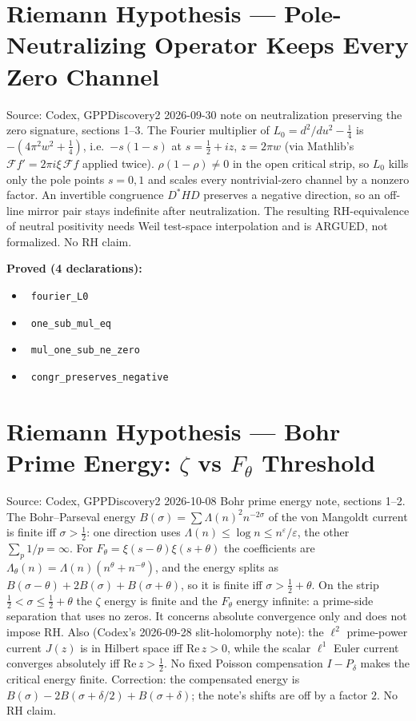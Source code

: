\documentclass{report}
\theoremstyle{definition}
\begin{document}
\section{Riemann Hypothesis --- Pole-Neutralizing Operator Keeps Every Zero Channel}
Source: Codex, GPPDiscovery2 2026-09-30 note on neutralization preserving the zero signature, sections 1--3. The Fourier multiplier of $L_0=d^2/du^2-\tfrac14$ is $-(4\pi^2w^2+\tfrac14)$, i.e.\ $-s(1-s)$ at $s=\tfrac12+iz$, $z=2\pi w$ (via Mathlib's $\mathcal Ff'=2\pi i\xi\,\mathcal Ff$ applied twice). $\rho(1-\rho)\ne0$ in the open critical strip, so $L_0$ kills only the pole points $s=0,1$ and scales every nontrivial-zero channel by a nonzero factor. An invertible congruence $D^*HD$ preserves a negative direction, so an off-line mirror pair stays indefinite after neutralization. The resulting RH-equivalence of neutral positivity needs Weil test-space interpolation and is ARGUED, not formalized. No RH claim.

\noindent\textbf{Proved (4 declarations):}
\begin{itemize}
  \item {}\leanok\ \texttt{fourier\_L0}
  \item {}\leanok\ \texttt{one\_sub\_mul\_eq}
  \item {}\leanok\ \texttt{mul\_one\_sub\_ne\_zero}
  \item {}\leanok\ \texttt{congr\_preserves\_negative}
\end{itemize}

\section{Riemann Hypothesis --- Bohr Prime Energy: $\zeta$ vs $F_\theta$ Threshold}
Source: Codex, GPPDiscovery2 2026-10-08 Bohr prime energy note, sections 1--2. The Bohr--Parseval energy $B(\sigma)=\sum\Lambda(n)^2n^{-2\sigma}$ of the von Mangoldt current is finite iff $\sigma>\tfrac12$: one direction uses $\Lambda(n)\le\log n\le n^\varepsilon/\varepsilon$, the other $\sum_p1/p=\infty$. For $F_\theta=\xi(s-\theta)\xi(s+\theta)$ the coefficients are $\Lambda_\theta(n)=\Lambda(n)(n^\theta+n^{-\theta})$, and the energy splits as $B(\sigma-\theta)+2B(\sigma)+B(\sigma+\theta)$, so it is finite iff $\sigma>\tfrac12+\theta$. On the strip $\tfrac12<\sigma\le\tfrac12+\theta$ the $\zeta$ energy is finite and the $F_\theta$ energy infinite: a prime-side separation that uses no zeros. It concerns absolute convergence only and does not impose RH. Also (Codex's 2026-09-28 slit-holomorphy note): the $\ell^2$ prime-power current $J(z)$ is in Hilbert space iff $\mathrm{Re}\,z>0$, while the scalar $\ell^1$ Euler current converges absolutely iff $\mathrm{Re}\,z>\tfrac12$. No fixed Poisson compensation $I-P_\delta$ makes the critical energy finite. Correction: the compensated energy is $B(\sigma)-2B(\sigma+\delta/2)+B(\sigma+\delta)$; the note's shifts are off by a factor $2$. No RH claim.
\end{document}
